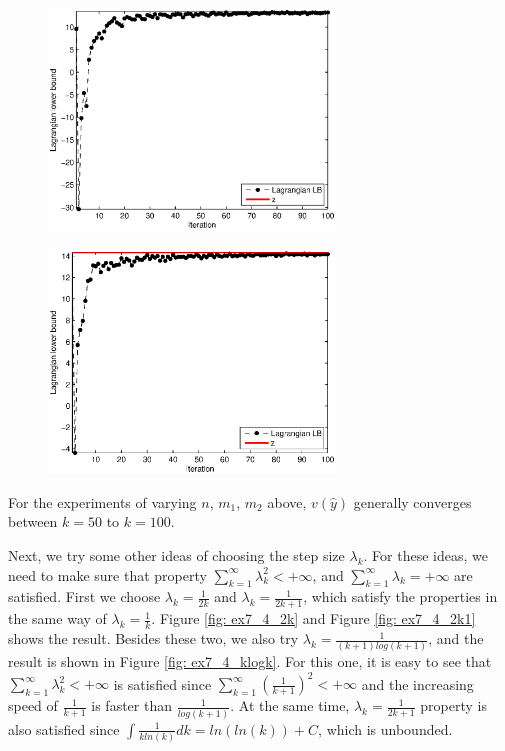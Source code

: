 \begin{figure}[!ht]
\centering
\begin{minipage}{0.49\textwidth}
\includegraphics[width=3.0in]{./p4/ex7_4_k_m2_20}
\label{fig: ex7_4_k_m2_20}
\end{minipage}
\begin{minipage}{0.49\textwidth}
\includegraphics[width=3.0in]{./p4/ex7_4_k_m2_30}
\label{fig: ex7_4_k_m2_30}
\end{minipage}
\end{figure}

For the experiments of varying $n$, $m_1$, $m_2$ above, $v(\widehat{y})$ generally converges between $k=50$ to $k=100$.

Next, we try some other ideas of choosing the step size $\lambda_k$. For these ideas, we need to make sure that property $\sum_{k=1}^{\infty} \lambda^2_k < +\infty$, and $\sum_{k=1}^{\infty} \lambda_k = +\infty$ are satisfied. First we choose $\lambda_k=\frac{1}{2k}$ and $\lambda_k=\frac{1}{2k+1}$, which satisfy the properties in the same way of $\lambda_k=\frac{1}{k}$. Figure \ref{fig: ex7_4_2k} and Figure \ref{fig: ex7_4_2k1} shows the result. Besides these two, we also try $\lambda_k=\frac{1}{(k+1)log(k+1)}$, and the result is shown in Figure \ref{fig: ex7_4_klogk}. For this one, it is easy to see that $\sum_{k=1}^{\infty} \lambda^2_k < +\infty$ is satisfied since $\sum_{k=1}^{\infty} (\frac{1}{k+1})^2 < +\infty$ and the increasing speed of $\frac{1}{k+1}$ is faster than $\frac{1}{log(k+1)}$. At the same time, $\lambda_k=\frac{1}{2k+1}$ property is also satisfied since $\int \frac{1}{kln(k)} dk=ln(ln(k))+C$, which is unbounded.

